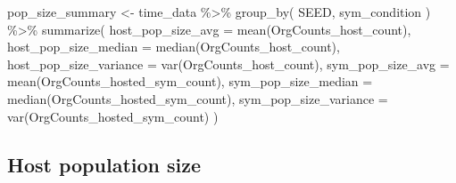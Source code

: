 \documentclass[
]{book}
\newenvironment{Shaded}{\begin{snugshade}}{\end{snugshade}}
\newcommand{\AttributeTok}[1]{\textcolor[rgb]{0.77,0.63,0.00}{#1}}
\newcommand{\FunctionTok}[1]{\textcolor[rgb]{0.00,0.00,0.00}{#1}}
\newcommand{\NormalTok}[1]{#1}
\newcommand{\OtherTok}[1]{\textcolor[rgb]{0.56,0.35,0.01}{#1}}
\newcommand{\SpecialCharTok}[1]{\textcolor[rgb]{0.00,0.00,0.00}{#1}}
\begin{document}
\begin{Shaded}
\begin{Highlighting}[]
\NormalTok{pop\_size\_summary }\OtherTok{\textless{}{-}}\NormalTok{ time\_data }\SpecialCharTok{\%\textgreater{}\%}
  \FunctionTok{group\_by}\NormalTok{(}
\NormalTok{    SEED,}
\NormalTok{    sym\_condition}
\NormalTok{  ) }\SpecialCharTok{\%\textgreater{}\%}
  \FunctionTok{summarize}\NormalTok{(}
    \AttributeTok{host\_pop\_size\_avg =} \FunctionTok{mean}\NormalTok{(OrgCounts\_host\_count),}
    \AttributeTok{host\_pop\_size\_median =} \FunctionTok{median}\NormalTok{(OrgCounts\_host\_count),}
    \AttributeTok{host\_pop\_size\_variance =} \FunctionTok{var}\NormalTok{(OrgCounts\_host\_count),}
    \AttributeTok{sym\_pop\_size\_avg =} \FunctionTok{mean}\NormalTok{(OrgCounts\_hosted\_sym\_count),}
    \AttributeTok{sym\_pop\_size\_median =} \FunctionTok{median}\NormalTok{(OrgCounts\_hosted\_sym\_count),}
    \AttributeTok{sym\_pop\_size\_variance =} \FunctionTok{var}\NormalTok{(OrgCounts\_hosted\_sym\_count)}
\NormalTok{  )}
\end{Highlighting}
\end{Shaded}

\hypertarget{host-population-size-1}{%
\subsection{Host population size}\label{host-population-size-1}}
\end{document}
